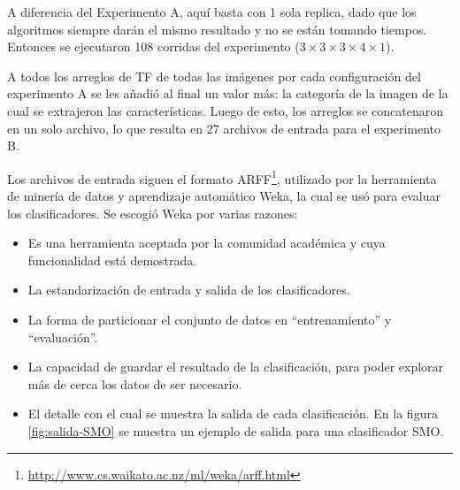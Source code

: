 A diferencia del Experimento A, aquí basta con 1 sola replica, dado que los algoritmos siempre darán el mismo resultado y no se están tomando tiempos. Entonces se ejecutaron 108 corridas del experimento ($3 \times 3 \times 3 \times 4 \times 1$).

A todos los arreglos de TF de todas las imágenes por cada configuración del experimento A se les añadió al final un valor más: la categoría de la imagen de la cual se extrajeron las características. Luego de esto, los arreglos se concatenaron en un solo archivo, lo que resulta en 27 archivos de entrada para el experimento B.

Los archivos de entrada siguen el formato ARFF\footnote{\url{http://www.cs.waikato.ac.nz/ml/weka/arff.html}}, utilizado por la herramienta de minería de datos y aprendizaje automático Weka\cite{Witten2011}, la cual se usó para evaluar los clasificadores. Se escogió Weka por varias razones:

\begin{itemize}
    \item Es una herramienta aceptada por la comunidad académica y cuya funcionalidad está demostrada\cite{Puurula2013}\cite{Rajanayagam2013}\cite{Medelyan2013}. 
    \item La estandarización de entrada y salida de los clasificadores.
    \item La forma de particionar el conjunto de datos en ``entrenamiento'' y ``evaluación''.
    \item La capacidad de guardar el resultado de la clasificación, para poder explorar más de cerca los datos de ser necesario.
    \item El detalle con el cual se muestra la salida de cada clasificación. En la figura \ref{fig:salida-SMO} se muestra un ejemplo de salida para una clasificador SMO.

\end{itemize}


